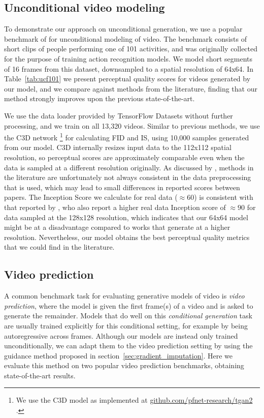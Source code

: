 \subsection{Unconditional video modeling}
\label{sec:unconditional_experiments}
To demonstrate our approach on unconditional generation, we use a popular benchmark of \citet{soomro2012ucf101} for unconditional modeling of video. The benchmark consists of short clips of people performing one of 101 activities, and was originally collected for the purpose of training action recognition models. We model short segments of 16 frames from this dataset, downsampled to a spatial resolution of 64x64. In Table~\ref{tab:ucf101} we present perceptual quality scores for videos generated by our model, and we compare against methods from the literature, finding that our method strongly improves upon the previous state-of-the-art. 

We use the data loader provided by TensorFlow Datasets \citep{TFDS} without further processing, and we train on all 13,320 videos. Similar to previous methods, we use the C3D network \citep{tran2015learning}\footnote{We use the C3D model as implemented at \url{github.com/pfnet-research/tgan2} \citep{saito2020train}.} for calculating FID and IS, using 10,000 samples generated from our model. C3D internally resizes input data to the 112x112 spatial resolution, so perceptual scores are approximately comparable even when the data is sampled at a different resolution originally. As discussed by \cite{yushchenko2019markov}, methods in the literature are unfortunately not always consistent in the data preprocessing that is used, which may lead to small differences in reported scores between papers. The Inception Score we calculate for real data ($\approx 60$) is consistent with that reported by \cite{kahembwe2020lower}, who also report a higher real data Inception score of $\approx 90$ for data sampled at the 128x128 resolution, which indicates that our 64x64 model might be at a disadvantage compared to works that generate at a higher resolution. Nevertheless, our model obtains the best perceptual quality metrics that we could find in the literature. 

\subsection{Video prediction}
\label{sec:video_pred}
A common benchmark task for evaluating generative models of video is \emph{video prediction}, where the model is given the first frame(s) of a video and is asked to generate the remainder. Models that do well on this \emph{conditional generation} task are usually trained explicitly for this conditional setting, for example by being autoregressive across frames. Although our models are instead only trained unconditionally, we can adapt them to the video prediction setting by using the guidance method proposed in section~\ref{sec:gradient_imputation}. Here we evaluate this method on two popular video prediction benchmarks, obtaining state-of-the-art results.

